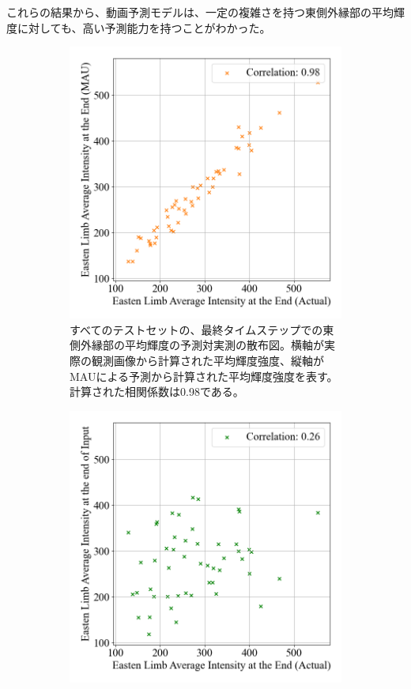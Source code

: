         これらの結果から、動画予測モデルは、一定の複雑さを持つ東側外縁部の平均輝度に対しても、高い予測能力を持つことがわかった。
        \begin{figure}[htbp]
          \begin{subfigure}[b]{0.53\textwidth}
            \centering
            \includegraphics[width=\textwidth]{figures/exp1/limb_scatter_gt_pd.png}
            \caption{すべてのテストセットの、最終タイムステップでの東側外縁部の平均輝度の予測対実測の散布図。横軸が実際の観測画像から計算された平均輝度強度、縦軸がMAUによる予測から計算された平均輝度強度を表す。計算された相関係数は0.98である。}
          \end{subfigure}
          \begin{subfigure}[b]{0.55\textwidth}
            \centering
            \includegraphics[width=\textwidth]{figures/exp1/limb_scatter_gt_sp.png}

\end{subfigure}
\end{figure}
